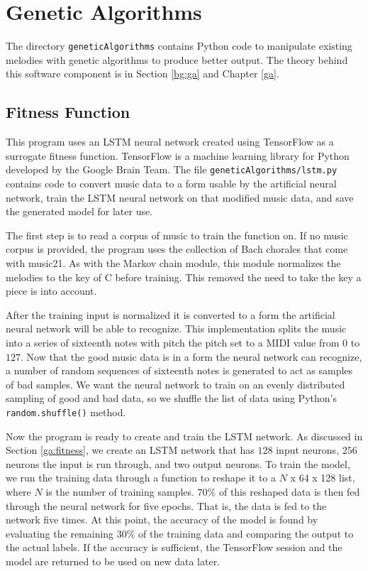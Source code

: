 \section{Genetic Algorithms} \label{software:ga}

The directory \texttt{geneticAlgorithms} contains Python code to manipulate existing melodies with genetic algorithms to produce better output.
The theory behind this software component is in Section \ref{bg:ga} and Chapter \ref{ga}.

\subsection{Fitness Function} \label{software:ga:fitness}

This program uses an LSTM neural network created using TensorFlow as a surrogate fitness function.
TensorFlow is a machine learning library for Python developed by the Google Brain Team.
The file \texttt{geneticAlgorithms/lstm.py} contains code to convert music data to a form usable by the artificial neural network, train the LSTM neural network on that modified music data, and save the generated model for later use.

The first step is to read a corpus of music to train the function on.
If no music corpus is provided, the program uses the collection of Bach chorales that come with music21.
As with the Markov chain module, this module normalizes the melodies to the key of C before training.
This removed the need to take the key a piece is into account.

After the training input is normalized it is converted to a form the artificial neural network will be able to recognize.
This implementation splits the music into a series of sixteenth notes with pitch the pitch set to a MIDI value from $0$ to $127$.
Now that the good music data is in a form the neural network can recognize, a number of random sequences of sixteenth notes is generated to act as samples of bad samples.
We want the neural network to train on an evenly distributed sampling of good and bad data, so we shuffle the list of data using Python's \texttt{random.shuffle()} method.

Now the program is ready to create and train the LSTM network.
As discussed in Section \ref{ga:fitness}, we create an LSTM network that has $128$ input neurons, $256$ neurons the input is run through, and two output neurons.
To train the model, we run the training data through a function to reshape it to a $N$ x 64 x 128 list, where $N$ is the number of training samples.
$70\%$ of this reshaped data is then fed through the neural network for five epochs.
That is, the data is fed to the network five times.
At this point, the accuracy of the model is found by evaluating the remaining $30\%$ of the training data and comparing the output to the actual labels.
If the accuracy is sufficient, the TensorFlow session and the model are returned to be used on new data later.


